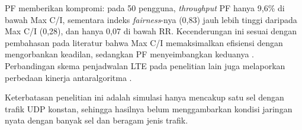 PF memberikan kompromi: pada 50 pengguna, \textit{throughput} PF hanya 9,6\% di bawah Max C/I, sementara indeks \textit{fairness}-nya (0,83) jauh lebih tinggi daripada Max C/I (0,28), dan hanya 0,07 di bawah RR. Kecenderungan ini sesuai dengan pembahasan pada literatur bahwa Max C/I memaksimalkan efisiensi dengan mengorbankan keadilan, sedangkan PF menyeimbangkan keduanya \parencite{capozzi2013,andrews2007}. Perbandingan skema penjadwalan LTE pada penelitian lain juga melaporkan perbedaan kinerja antaralgoritma \parencite{alqahtani2013}.

Keterbatasan penelitian ini adalah simulasi hanya mencakup satu sel dengan trafik UDP konstan, sehingga hasilnya belum menggambarkan kondisi jaringan nyata dengan banyak sel dan beragam jenis trafik.
